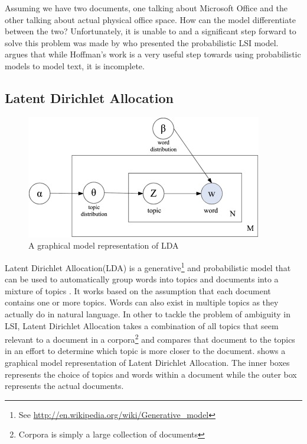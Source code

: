 Assuming we have two documents, one talking about Microsoft Office and the other talking about
actual physical office space. How can the model differentiate between the two? Unfortunately, it is
unable to and a significant step forward to solve this problem was made by
\citet{hofmann1999probabilistic} who presented the probabilistic LSI model. \citet{blei2003latent}
argues that while Hoffman's work is a very useful step towards using probabilistic models to model
text, it is incomplete.

\subsection{Latent Dirichlet Allocation}
\label{sec:bg_lda}

\begin{figure}[H]
\begin{center}
    \includegraphics[scale=1.5]{Figures/lda}
\end{center}
\caption{A graphical model representation of LDA}
\label{fig:lda}
\end{figure}

Latent Dirichlet Allocation(LDA) is a generative\footnote{See
\url{http://en.wikipedia.org/wiki/Generative_model}} and probabilistic model that can be used to
automatically group words into topics and documents into a mixture of topics \citep{blei2003latent}.
It works based on the assumption that each document contains one or more topics. Words can also
exist in multiple topics as they actually do in natural language. In other to tackle the problem of
ambiguity in LSI, Latent Dirichlet Allocation takes a combination of all topics that seem relevant
to a document in a corpora\footnote{Corpora is simply a large collection of documents} and compares
that document to the topics in an effort to determine which topic is more closer to the document.
 shows a graphical model representation of Latent Dirichlet Allocation. The inner
boxes represents the choice of topics and words within a document while the outer box represents the
actual documents.

